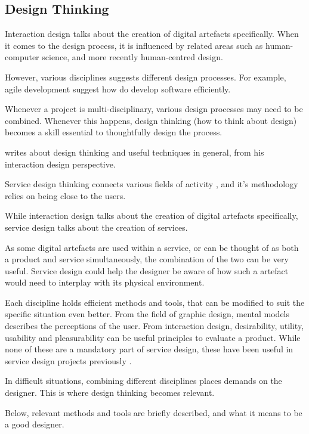 \subsection{Design Thinking}

%

Interaction design talks about the creation of digital artefacts specifically. When it comes to the design process, it is influenced by related areas such as human-computer science, and more recently human-centred design.

However, various disciplines suggests different design processes. For example, agile development suggest how do develop software efficiently.

Whenever a project is multi-disciplinary, various design processes may need to be combined. Whenever this happens, design thinking (how to think about design) becomes a skill essential to thoughtfully design the process.

\cite{lowgren} writes about design thinking and useful techniques in general, from his interaction design perspective.

Service design thinking connects various fields of activity \citep{stickdorn}, and it's methodology relies on being close to the users.

While interaction design talks about the creation of digital artefacts specifically, service design talks about the creation of services.

As some digital artefacts are used within a service, or can be thought of as both a product and service simultaneously, the combination of the two can be very useful. Service design could help the designer be aware of how such a artefact would need to interplay with its physical environment.

Each discipline holds efficient methods and tools, that can be modified to suit the specific situation even better. From the field of graphic design, mental models describes the perceptions of the user. From interaction design, desirability, utility, usability and pleasurability can be useful principles to evaluate a product. While none of these are a mandatory part of service design, these have been useful in service design projects previously \citep{stickdorn}.

In difficult situations, combining different disciplines places demands on the designer. This is where design thinking becomes relevant.

Below, relevant methods and tools are briefly described, and what it means to be a good designer.


